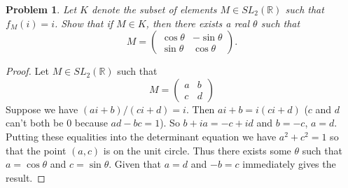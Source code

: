 \documentclass{article}
\newtheorem{problem}{Problem}
\begin{document}
\begin{problem}
\label{rot}
Let $K$ denote the subset of elements $M \in SL_2(\mathbb{R})$ such that $f_M(i) = i$. Show that if $M \in K$, then there exists a real $\theta$ such that
\[
M =
\left (
\begin{array}{cc}
\cos \theta & -\sin \theta\\
\sin \theta & \cos \theta
\end{array}
\right ).
\]
\end{problem}
\begin{proof}
Let $M \in SL_2(\mathbb{R})$ such that
\[
M =
\left (
\begin{array}{cc}
a & b\\
c & d
\end{array}
\right )
\]
Suppose we have $(ai + b)/(ci + d) = i$. Then $ai + b = i(ci+d)$ ($c$ and $d$ can't both be $0$ because $ad-bc = 1$). So $b + ia = -c + id$ and $b = -c$, $a = d$. Putting these equalities into the determinant equation we have $a^2 + c^2 = 1$ so that the point $(a,c)$ is on the unit circle. Thus there exists some $\theta$ such that $a = \cos \theta$ and $c = \sin \theta$. Given that $a = d$ and $-b = c$ immediately gives the result.
\end{proof}
\end{document}
